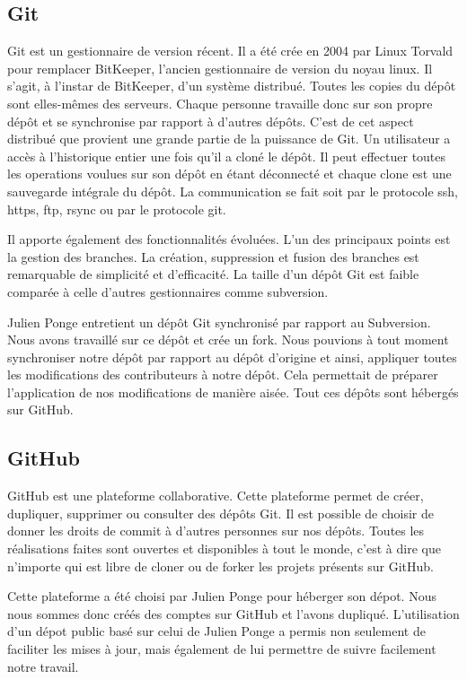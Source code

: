 \subsection{Git}
Git est un gestionnaire de version récent. Il a été crée en 2004 par Linux Torvald pour remplacer BitKeeper, l'ancien gestionnaire de version du noyau linux.
Il s'agit, à l'instar de BitKeeper, d'un système distribué. Toutes les copies du dépôt sont elles-mêmes des serveurs.
Chaque personne travaille donc sur son propre dépôt et se synchronise par rapport à d'autres dépôts. C'est de cet aspect distribué que provient une grande partie de la puissance de Git.
Un utilisateur a accès à l'historique entier une fois qu'il a cloné le dépôt. Il peut effectuer toutes les operations voulues sur son dépôt en étant déconnecté et chaque clone est une sauvegarde intégrale du dépôt.
La communication se fait soit par le protocole ssh, https, ftp, rsync ou par le protocole git.

Il apporte également des fonctionnalités évoluées. L'un des principaux points est la gestion des branches. La création, suppression et fusion des branches est remarquable de simplicité et d'efficacité.
La taille d'un dépôt Git est faible comparée à celle d'autres gestionnaires comme subversion.

Julien Ponge entretient un dépôt Git synchronisé par rapport au Subversion. Nous avons travaillé sur ce dépôt et crée un fork.
Nous pouvions à tout moment synchroniser notre dépôt par rapport au dépôt d'origine et ainsi, appliquer toutes les modifications des contributeurs à notre dépôt.
Cela permettait de préparer l'application de nos modifications de manière aisée. Tout ces dépôts sont hébergés sur GitHub.
\subsection{GitHub}
GitHub est une plateforme collaborative. Cette plateforme permet de créer, dupliquer, supprimer ou consulter des dépôts Git.
Il est possible de choisir de donner les droits de commit à d'autres personnes sur nos dépôts. Toutes les réalisations faites sont ouvertes et disponibles à tout le monde, c'est à dire que n'importe qui est libre de cloner ou de forker les projets présents sur GitHub.

Cette plateforme a été choisi par Julien Ponge pour héberger son dépot. Nous nous sommes donc créés des comptes sur GitHub et l'avons dupliqué. L'utilisation d'un dépot public basé sur celui de Julien Ponge a permis non seulement de faciliter les mises à jour, mais également de lui permettre de suivre facilement notre travail.



